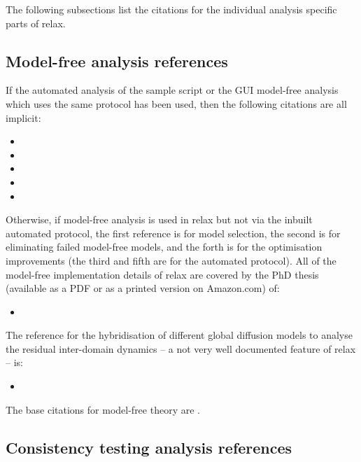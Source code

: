 The following subsections list the citations for the individual analysis specific parts of relax.



\subsection*{Model-free analysis references}

If the automated analysis of the  sample script or the GUI model-free analysis which uses the same protocol has been used, then the following citations are all implicit:
\begin{itemize}
  \item {}
  \item {}
  \item {}
  \item {}
  \item {}
\end{itemize}

Otherwise, if model-free analysis is used in relax but not via the inbuilt automated protocol, the first reference is for model selection, the second is for eliminating failed model-free models, and the forth is for the optimisation improvements (the third and fifth are for the automated protocol).
All of the model-free implementation details of relax are covered by the PhD thesis (available as a PDF or as a printed version on Amazon.com) of:
\begin{itemize}
  \item {}
\end{itemize}

The reference for the hybridisation of different global diffusion models to analyse the residual inter-domain dynamics -- a not very well documented feature of relax -- is:
\begin{itemize}
  \item {}
\end{itemize}

The base citations for model-free theory are \citet{LipariSzabo82a,LipariSzabo82b,Clore90a}.



\subsection*{Consistency testing analysis references}

